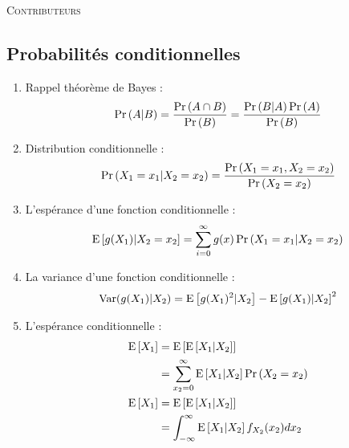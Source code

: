 \documentclass[10pt, french, landscape]{article}
\begin{document}
\begin{center}
	\textsc{\Large Contributeurs}\\[0.5cm] 
\end{center}


\newpage

\small
\begin{multicols*}{2} %
\section{Probabilités conditionnelles}
\begin{enumerate}[label=\faAngleRight]
\item Rappel théorème de Bayes : 
\begin{align*}
\Pr \left( A | B \right) = \frac{\Pr \left( A \cap B \right)}{\Pr \left( B \right)} = \frac{\Pr \left( B|A \right) \Pr \left( A \right)}{\Pr \left( B \right)}
\end{align*}

\item Distribution conditionnelle : 
\begin{align*}
\Pr \left( X_1 = x_1 | X_2 = x_2 \right) & = \frac{\Pr \left( X_1 = x_1, X_2 = x_2 \right)}{\Pr \left( X_2 = x_2 \right)} \\
\end{align*}

\item L'espérance d'une fonction conditionnelle : 
\begin{align*}
\mathrm{E} \left[ g(X_1) | X_2 = x_2 \right] = \sum_{i=0}^{\infty} g(x) \Pr \left( X_1 = x_1 | X_2 = x_2 \right)
\end{align*}

\item La variance d'une fonction conditionnelle :
\begin{align*}
\mathrm{Var} (g(X_1) | X_2) = \mathrm{E} \left[ g(X_1)^2 |X_2 \right] - \mathrm{E} \left[ g(X_1) | X_2 \right]^2
\end{align*}

\item L'espérance conditionnelle : 
\begin{align*}
\mathrm{E} \left[ X_1 \right] 	& = \mathrm{E} \left[ \mathrm{E} \left[ X_1 | X_2 \right] \right] \\
			& = \sum_{x_2 = 0}^{\infty} \mathrm{E} \left[ X_1 | X_2 \right] \Pr \left( X_2 = x_2 \right) \\
\mathrm{E} \left[ X_1 \right]	& = \mathrm{E} \left[ \mathrm{E} \left[ X_1 | X_2 \right] \right] \\
			& = \int_{-\infty}^{\infty} \mathrm{E} \left[ X_1 | X_2 \right] f_{X_2}(x_2) d x_2 \\
\end{align*}


\end{enumerate}
\end{multicols*}
\end{document}
